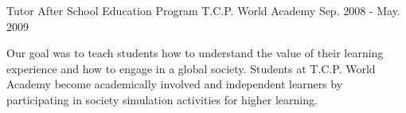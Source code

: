 \begin{cventries}
  \cventry
    {Tutor} %
    {After School Education Program} %
    {T.C.P. World Academy} %
    {Sep. 2008 - May. 2009} %
    {
      \begin{cvcompactparagraph}
        Our goal was to teach students how to understand the value of their learning experience and how to engage in a global society.  Students at T.C.P. World Academy become academically involved and independent learners by participating in society simulation activities for higher learning.
      \end{cvcompactparagraph}
    }

\end{cventries}
